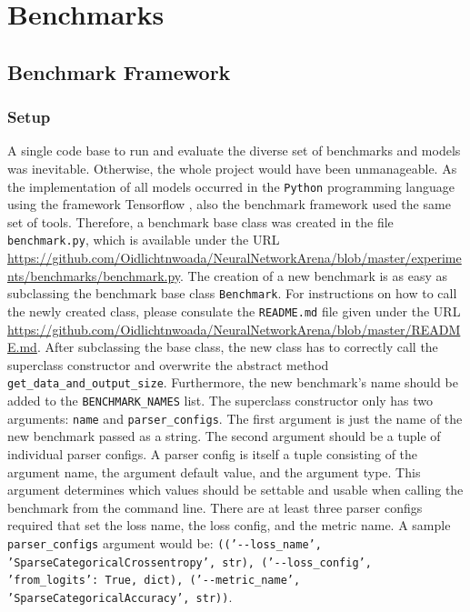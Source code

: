 \documentclass[draft,final]{vutinfth} %
\begin{document}
\chapter{Benchmarks}


\section{Benchmark Framework} \label{benchmark_framework}

\subsection{Setup}
A single code base to run and evaluate the diverse set of benchmarks and models was inevitable.
Otherwise, the whole project would have been unmanageable.
As the implementation of all models occurred in the \texttt{Python} programming language \cite{Python3} using the framework Tensorflow \cite{Tensorflow}, also the benchmark framework used the same set of tools.
Therefore, a benchmark base class was created in the file \texttt{benchmark.py}, which is available under the URL \url{https://github.com/Oidlichtnwoada/NeuralNetworkArena/blob/master/experiments/benchmarks/benchmark.py}.
The creation of a new benchmark is as easy as subclassing the benchmark base class \texttt{Benchmark}.
For instructions on how to call the newly created class, please consulate the \texttt{README.md} file given under the URL \url{https://github.com/Oidlichtnwoada/NeuralNetworkArena/blob/master/README.md}.
After subclassing the base class, the new class has to correctly call the superclass constructor and overwrite the abstract method \texttt{get\_data\_and\_output\_size}.
Furthermore, the new benchmark's name should be added to the \texttt{BENCHMARK\_NAMES} list.
The superclass constructor only has two arguments: \texttt{name} and \texttt{parser\_configs}.
The first argument is just the name of the new benchmark passed as a string.
The second argument should be a tuple of individual parser configs.
A parser config is itself a tuple consisting of the argument name, the argument default value, and the argument type.
This argument determines which values should be settable and usable when calling the benchmark from the command line.
There are at least three parser configs required that set the loss name, the loss config, and the metric name.
A sample \texttt{parser\_configs} argument would be: \texttt{(('-{}-loss\_name', 'SparseCategoricalCrossentropy', str), ('-{}-loss\_config', {'from\_logits': True}, dict), ('-{}-metric\_name', 'SparseCategoricalAccuracy', str))}.
\end{document}
